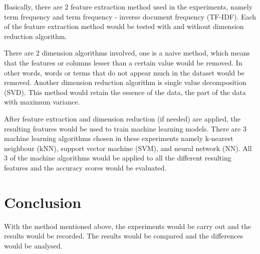 Basically, there are 2 feature extraction method used in the experiments, namely term frequency and term frequency - inverse document frequency (TF-IDF). Each of the feature extraction method would be tested with and without dimension reduction algorithm.

There are 2 dimension algorithms involved, one is a naive method, which means that the features or columns lesser than a certain value would be removed. In other words, words or terms that do not appear much in the dataset would be removed. Another dimension reduction algorithm is single value decomposition (SVD). This method would retain the essence of the data, the part of the data with maximum variance. 

After feature extraction and dimension reduction (if needed) are applied, the resulting features would be used to train machine learning models. There are 3 machine learning algorithms chosen in these experiments namely k-nearest neighbour (kNN), support vector machine (SVM), and neural network (NN). All 3 of the machine algorithms would be applied to all the different resulting features and the accuracy scores would be evaluated.


\section{Conclusion}
With the method mentioned above, the experiments would be carry out and the results would be recorded. The results would be compared and the differences would be analysed.